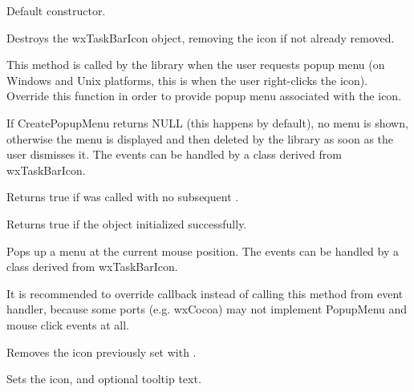 
\label{wxtaskbariconctor}


Default constructor.

\label{wxtaskbaricondtor}


Destroys the wxTaskBarIcon object, removing the icon if not already removed.

\label{wxtaskbariconcreatepopupmenu}


This method is called by the library when the user requests popup menu
(on Windows and Unix platforms, this is when the user right-clicks the icon).
Override this function in order to provide popup menu associated with the icon.

If CreatePopupMenu returns NULL (this happens by default),
no menu is shown, otherwise the menu is
displayed and then deleted by the library as soon as the user dismisses it.
The events can be handled by a class derived from wxTaskBarIcon.

\label{wxtaskbariconisiconinstalled}


Returns true if  was called with no subsequent .

\label{wxtaskbariconisok}


Returns true if the object initialized successfully.

\label{wxtaskbariconpopupmenu}


Pops up a menu at the current mouse position. The events can be handled by
a class derived from wxTaskBarIcon.


It is recommended to override
callback instead of calling this method from event handler, because some
ports (e.g. wxCocoa) may not implement PopupMenu and mouse click events at all.

\label{wxtaskbariconremoveicon}


Removes the icon previously set with .

\label{wxtaskbariconseticon}


Sets the icon, and optional tooltip text.


